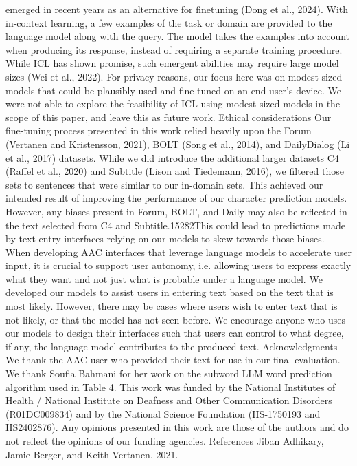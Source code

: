 emerged in recent years as an alternative for finetuning (Dong et al., 2024). With in-context learning, a few examples of the task or domain are provided to the language model along with the query.
The model takes the examples into account when
producing its response, instead of requiring a separate training procedure. While ICL has shown
promise, such emergent abilities may require large
model sizes (Wei et al., 2022). For privacy reasons,
our focus here was on modest sized models that
could be plausibly used and fine-tuned on an end
user’s device. We were not able to explore the feasibility of ICL using modest sized models in the
scope of this paper, and leave this as future work.
Ethical considerations
Our fine-tuning process presented in this work relied heavily upon the Forum (Vertanen and Kristensson, 2021), BOLT (Song et al., 2014), and DailyDialog (Li et al., 2017) datasets. While we did
introduce the additional larger datasets C4 (Raffel
et al., 2020) and Subtitle (Lison and Tiedemann,
2016), we filtered those sets to sentences that were
similar to our in-domain sets. This achieved our intended result of improving the performance of our
character prediction models. However, any biases
present in Forum, BOLT, and Daily may also be
reflected in the text selected from C4 and Subtitle.15282This could lead to predictions made by text entry
interfaces relying on our models to skew towards
those biases.
When developing AAC interfaces that leverage
language models to accelerate user input, it is crucial to support user autonomy, i.e. allowing users
to express exactly what they want and not just what
is probable under a language model. We developed
our models to assist users in entering text based
on the text that is most likely. However, there may
be cases where users wish to enter text that is not
likely, or that the model has not seen before. We
encourage anyone who uses our models to design
their interfaces such that users can control to what
degree, if any, the language model contributes to
the produced text.
Acknowledgments
We thank the AAC user who provided their text
for use in our final evaluation. We thank Soufia
Bahmani for her work on the subword LLM word
prediction algorithm used in Table 4. This work
was funded by the National Institutes of Health
/ National Institute on Deafness and Other Communication Disorders (R01DC009834) and by the
National Science Foundation (IIS-1750193 and IIS2402876). Any opinions presented in this work are
those of the authors and do not reflect the opinions
of our funding agencies.
References
Jiban Adhikary, Jamie Berger, and Keith Vertanen. 2021.
